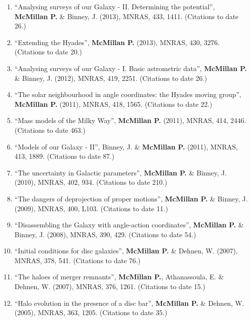 \documentclass{resume}
\begin{document}
\begin{enumerate}
\item ``Analysing surveys of our Galaxy - II. Determining the potential'', \textbf{McMillan P.} \& Binney, J. (2013), MNRAS, 433, 1411. (Citations to date 26.)

\item ``Extending the Hyades'', \textbf{McMillan P.} (2013), MNRAS, 430, 3276. (Citations to date 20.)

\item ``Analysing surveys of our Galaxy - I. Basic astrometric data'', \textbf{McMillan P.} \& Binney, J. (2012), MNRAS, 419, 2251. (Citations to date 26.)

\item ``The solar neighbourhood in angle coordinates: the Hyades moving group'', \textbf{McMillan P.} (2011), MNRAS, 418, 1565. (Citations to date 22.)

\item ``Mass models of the Milky Way'', \textbf{McMillan P.} (2011), MNRAS, 414, 2446. (Citations to date 463.)

\item ``Models of our Galaxy - II'', Binney, J. \& \textbf{McMillan P.} (2011), MNRAS, 413, 1889. (Citations to date 87.)

\item ``The uncertainty in Galactic parameters'', \textbf{McMillan P.} \& Binney, J. (2010), MNRAS, 402, 934. (Citations to date 210.)

\item ``The dangers of deprojection of proper motions'', \textbf{McMillan P.} \& Binney, J. (2009), MNRAS, 400, L103. (Citations to date 11.)

\item ``Disassembling the Galaxy with angle-action coordinates'', \textbf{McMillan P.} \& Binney, J. (2008), MNRAS, 390, 429. (Citations to date 54.)

\item ``Initial conditions for disc galaxies'', \textbf{McMillan P.} \& Dehnen, W. (2007), MNRAS, 378, 541. (Citations to date 76.)

\item ``The haloes of merger remnants'', \textbf{McMillan P.}, Athanassoula, E. \& Dehnen, W. (2007), MNRAS, 376, 1261. (Citations to date 15.)

\item ``Halo evolution in the presence of a disc bar'', \textbf{McMillan P.} \& Dehnen, W. (2005), MNRAS, 363, 1205. (Citations to date 35.)

\end{enumerate}
\end{document}
